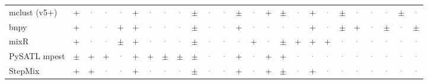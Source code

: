 \documentclass[10pt,a4paper]{article}
\begin{document}
\begin{landscape}
{\begin{longtable}{@{}l *{24}{c}@{}}
mclust (v5+) & \cellcolor{yes!35}+ & \textcolor{gray}{·} & \textcolor{gray}{·} & \textcolor{gray}{·} & \cellcolor{yes!35}+ & \textcolor{gray}{·} & \textcolor{gray}{·} & \textcolor{gray}{·} & \cellcolor{part!45}$\pm$ & \textcolor{gray}{·} & \textcolor{gray}{·} & \cellcolor{part!45}$\pm$ & \textcolor{gray}{·} & \cellcolor{yes!35}+ & \cellcolor{part!45}$\pm$ & \textcolor{gray}{·} & \cellcolor{yes!35}+ & \textcolor{gray}{·} & \cellcolor{part!45}$\pm$ & \textcolor{gray}{·} & \textcolor{gray}{·} & \textcolor{gray}{·} & \cellcolor{part!45}$\pm$ & \textcolor{gray}{·} \\
bnpy & \cellcolor{yes!35}+ & \textcolor{gray}{·} & \textcolor{gray}{·} & \cellcolor{yes!35}+ & \cellcolor{yes!35}+ & \textcolor{gray}{·} & \textcolor{gray}{·} & \textcolor{gray}{·} & \cellcolor{part!45}$\pm$ & \textcolor{gray}{·} & \textcolor{gray}{·} & \cellcolor{yes!35}+ & \textcolor{gray}{·} & \textcolor{gray}{·} & \textcolor{gray}{·} & \textcolor{gray}{·} & \cellcolor{yes!35}+ & \textcolor{gray}{·} & \cellcolor{part!45}$\pm$ & \cellcolor{yes!35}+ & \textcolor{gray}{·} & \cellcolor{part!45}$\pm$ & \textcolor{gray}{·} & \cellcolor{part!45}$\pm$ \\
mixR & \cellcolor{yes!35}+ & \textcolor{gray}{·} & \textcolor{gray}{·} & \cellcolor{part!45}$\pm$ & \cellcolor{yes!35}+ & \textcolor{gray}{·} & \textcolor{gray}{·} & \textcolor{gray}{·} & \cellcolor{part!45}$\pm$ & \textcolor{gray}{·} & \textcolor{gray}{·} & \textcolor{gray}{·} & \cellcolor{yes!35}+ & \textcolor{gray}{·} & \cellcolor{part!45}$\pm$ & \cellcolor{yes!35}+ & \cellcolor{yes!35}+ & \cellcolor{yes!35}+ & \textcolor{gray}{·} & \textcolor{gray}{·} & \textcolor{gray}{·} & \textcolor{gray}{·} & \textcolor{gray}{·} & \textcolor{gray}{·} \\
PySATL mpest & \cellcolor{part!45}$\pm$ & \cellcolor{yes!35}+ & \cellcolor{yes!35}+ & \textcolor{gray}{·} & \cellcolor{yes!35}+ & \cellcolor{yes!35}+ & \cellcolor{part!45}$\pm$ & \cellcolor{part!45}$\pm$ & \cellcolor{part!45}$\pm$ & \textcolor{gray}{·} & \textcolor{gray}{·} & \cellcolor{yes!35}+ & \textcolor{gray}{·} & \cellcolor{yes!35}+ & \cellcolor{yes!35}+ & \textcolor{gray}{·} & \textcolor{gray}{·} & \textcolor{gray}{·} & \textcolor{gray}{·} & \textcolor{gray}{·} & \textcolor{gray}{·} & \textcolor{gray}{·} & \textcolor{gray}{·} & \textcolor{gray}{·} \\
StepMix & \cellcolor{yes!35}+ & \cellcolor{yes!35}+ & \textcolor{gray}{·} & \textcolor{gray}{·} & \cellcolor{yes!35}+ & \textcolor{gray}{·} & \textcolor{gray}{·} & \textcolor{gray}{·} & \cellcolor{part!45}$\pm$ & \textcolor{gray}{·} & \textcolor{gray}{·} & \cellcolor{yes!35}+ & \textcolor{gray}{·} & \cellcolor{yes!35}+ & \cellcolor{part!45}$\pm$ & \textcolor{gray}{·} & \cellcolor{yes!35}+ & \textcolor{gray}{·} & \textcolor{gray}{·} & \textcolor{gray}{·} & \textcolor{gray}{·} & \textcolor{gray}{·} & \textcolor{gray}{·} & \textcolor{gray}{·} \\

\end{longtable}}
\end{landscape}
\end{document}
